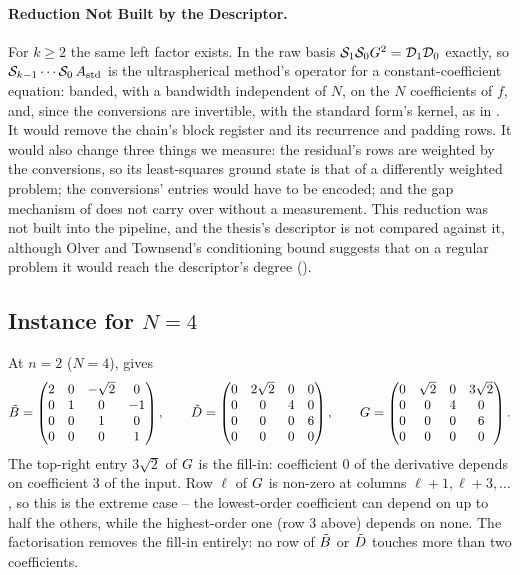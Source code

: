 \paragraph{Reduction Not Built by the Descriptor.} For $k\ge2$ the same left factor exists. In the raw basis $\mathcal{S}_1\mathcal{S}_0G^2=\mathcal{D}_1\mathcal{D}_0$ exactly, so $\mathcal{S}_{k-1}\cdots\mathcal{S}_0\,A_{\mathrm{std}}$ is the ultraspherical method's operator for a constant-coefficient equation: banded, with a bandwidth independent of $N$, on the $N$ coefficients of $f$, and, since the conversions are invertible, with the standard form's kernel, as in . It would remove the chain's block register and its recurrence and padding rows. It would also change three things we measure: the residual's rows are weighted by the conversions, so its least-squares ground state is that of a differently weighted problem; the conversions' entries would have to be encoded; and the gap mechanism of  does not carry over without a measurement. This reduction was not built into the pipeline, and the thesis's descriptor is not compared against it, although Olver and Townsend's conditioning bound suggests that on a regular problem it would reach the descriptor's degree ().

\subsection{Instance for \texorpdfstring{$N = 4$}{N = 4}}

At $n = 2$ ($N = 4$),  gives
\begin{equation}
    \tilde{B} =
    \begin{pmatrix}
        2 & 0 & -\sqrt{2} & 0 \\
        0 & 1 & 0 & -1 \\
        0 & 0 & 1 & 0 \\
        0 & 0 & 0 & 1
    \end{pmatrix},
    \qquad
    \tilde{D} =
    \begin{pmatrix}
        0 & 2\sqrt{2} & 0 & 0 \\
        0 & 0 & 4 & 0 \\
        0 & 0 & 0 & 6 \\
        0 & 0 & 0 & 0
    \end{pmatrix},
    \qquad
    G =
    \begin{pmatrix}
        0 & \sqrt{2} & 0 & 3\sqrt{2} \\
        0 & 0 & 4 & 0 \\
        0 & 0 & 0 & 6 \\
        0 & 0 & 0 & 0
    \end{pmatrix}.
\end{equation}
The top-right entry $3\sqrt{2}$ of $G$ is the fill-in: coefficient $0$ of the
derivative depends on coefficient $3$ of the input. Row $\ell$ of $G$ is
non-zero at columns $\ell+1, \ell+3, \dots$, so this is the extreme case --
the lowest-order coefficient can depend on up to half the others, while the
highest-order one (row $3$ above) depends on none. The factorisation removes
the fill-in entirely: no row of $\tilde{B}$ or $\tilde{D}$ touches more than
two coefficients.

